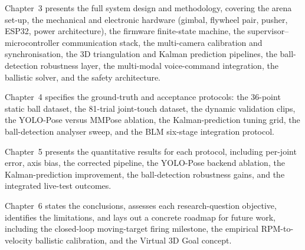 Chapter~3 presents the full system design and methodology, covering the arena set-up, the mechanical and electronic hardware (gimbal, flywheel pair, pusher, ESP32, power architecture), the firmware finite-state machine, the supervisor--microcontroller communication stack, the multi-camera calibration and synchronisation, the 3D triangulation and Kalman prediction pipelines, the ball-detection robustness layer, the multi-modal voice-command integration, the ballistic solver, and the safety architecture.

Chapter~4 specifies the ground-truth and acceptance protocols: the 36-point static ball dataset, the 81-trial joint-touch dataset, the dynamic validation clips, the YOLO-Pose versus MMPose ablation, the Kalman-prediction tuning grid, the ball-detection analyser sweep, and the BLM six-stage integration protocol.

Chapter~5 presents the quantitative results for each protocol, including per-joint error, axis bias, the corrected pipeline, the YOLO-Pose backend ablation, the Kalman-prediction improvement, the ball-detection robustness gains, and the integrated live-test outcomes.

Chapter~6 states the conclusions, assesses each research-question objective, identifies the limitations, and lays out a concrete roadmap for future work, including the closed-loop moving-target firing milestone, the empirical RPM-to-velocity ballistic calibration, and the Virtual 3D Goal concept.
